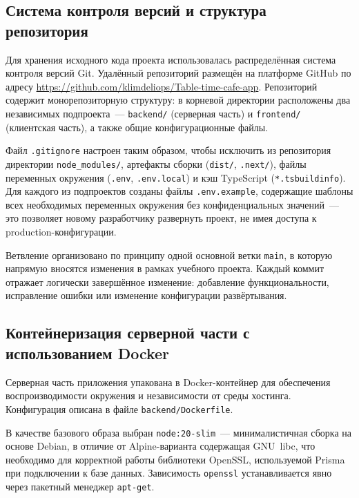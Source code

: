 \subsection{Система контроля версий и структура репозитория}

Для хранения исходного кода проекта использовалась распределённая
система контроля версий Git. Удалённый репозиторий размещён на
платформе GitHub по адресу
\url{https://github.com/klimdeliops/Table-time-cafe-app}.
Репозиторий содержит монорепозиторную структуру: в корневой
директории расположены два независимых подпроекта~---
\texttt{backend/} (серверная часть) и \texttt{frontend/}
(клиентская часть), а также общие конфигурационные файлы.

Файл \texttt{.gitignore} настроен таким образом, чтобы исключить
из репозитория директории \texttt{node\_modules/}, артефакты сборки
(\texttt{dist/}, \texttt{.next/}), файлы переменных окружения
(\texttt{.env}, \texttt{.env.local}) и кэш TypeScript
(\texttt{*.tsbuildinfo}). Для каждого из подпроектов созданы файлы
\texttt{.env.example}, содержащие шаблоны всех необходимых
переменных окружения без конфиденциальных значений~--- это позволяет
новому разработчику развернуть проект, не имея доступа к
production-конфигурации.

Ветвление организовано по принципу одной основной ветки \texttt{main},
в которую напрямую вносятся изменения в рамках учебного проекта.
Каждый коммит отражает логически завершённое изменение: добавление
функциональности, исправление ошибки или изменение конфигурации
развёртывания.

\subsection{Контейнеризация серверной части с использованием Docker}

Серверная часть приложения упакована в Docker-контейнер для
обеспечения воспроизводимости окружения и независимости от среды
хостинга. Конфигурация описана в файле \texttt{backend/Dockerfile}.

В качестве базового образа выбран \texttt{node:20-slim}~---
минималистичная сборка на основе Debian, в отличие от Alpine-варианта
содержащая GNU~libc, что необходимо для корректной работы библиотеки
OpenSSL, используемой Prisma при подключении к базе данных.
Зависимость \texttt{openssl} устанавливается явно через пакетный
менеджер \texttt{apt-get}.

